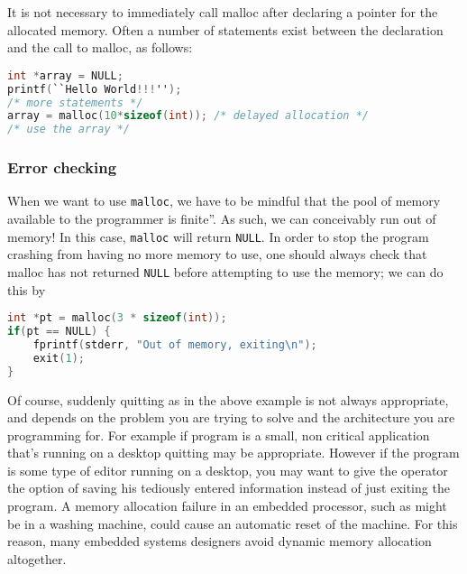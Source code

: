 It is not necessary to immediately call malloc after declaring a pointer for
the allocated memory.  Often a number of statements exist between the
declaration and the call to malloc, as follows:

\lstset{basicstyle=\scriptsize, numbers=left, captionpos=b, tabsize=4}
\begin{lstlisting}[caption=Section \thesection listing \arabic{memcnt},language={C},
breaklines=true,xleftmargin=15pt,label=lst:section\thesection listing\arabic{memcnt}]
int *array = NULL;
printf(``Hello World!!!'');
/* more statements */
array = malloc(10*sizeof(int)); /* delayed allocation */
/* use the array */
\end{lstlisting}

\subsubsection{Error checking}
When we want to use \texttt{malloc}, we have to be mindful that the pool of
memory available to the programmer is finite''. As such, we can conceivably run
out of memory! In this case, \texttt{malloc} will return \texttt{NULL}. In
order to stop the program crashing from having no more memory to use, one
should always check that malloc has not returned \texttt{NULL} before
attempting to use the memory; we can do this by 
\lstset{basicstyle=\scriptsize, numbers=left, captionpos=b, tabsize=4}
\begin{lstlisting}[caption=Section \thesection listing \arabic{memcnt},language={C},
breaklines=true,xleftmargin=15pt,label=lst:section\thesection listing\arabic{memcnt}]
int *pt = malloc(3 * sizeof(int));
if(pt == NULL) {
	fprintf(stderr, "Out of memory, exiting\n");
	exit(1);
}
\end{lstlisting}

Of course, suddenly quitting as in the above example is not always appropriate,
and depends on the problem you are trying to solve and the architecture you are
programming for. For example if program is a small, non critical application
that's running on a desktop quitting may be appropriate. However if the program
is some type of editor running on a desktop, you may want to give the operator
the option of saving his tediously entered information instead of just exiting
the program. A memory allocation failure in an embedded processor, such as
might be in a washing machine, could cause an automatic reset of the machine.
For this reason, many embedded systems designers avoid dynamic memory
allocation altogether.

